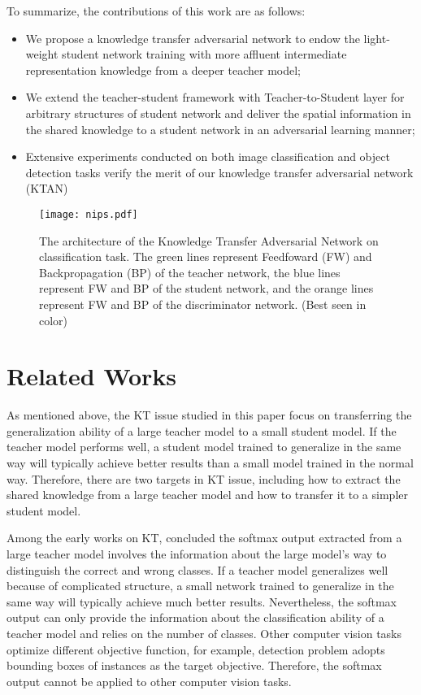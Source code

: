 \documentclass[letterpaper]{article} %
\begin{document}
To summarize, the contributions of this work are as follows:

\begin{itemize}
\item{We propose a knowledge transfer adversarial network to endow the light-weight student network training with more affluent intermediate representation knowledge from a deeper teacher model;} 
\item{We extend the teacher-student framework with Teacher-to-Student layer for arbitrary structures of student network and deliver the spatial information in the shared knowledge to a student network in an adversarial learning manner;} 
\item{Extensive experiments conducted on both image classification and object detection tasks verify the merit of our knowledge transfer adversarial network (KTAN)} 
\end{itemize}

\begin{figure*}[t]
    \begin{center}
        \texttt{[image: nips.pdf]}
        \caption{The architecture of the Knowledge Transfer Adversarial Network on classification task. The green lines represent Feedfoward (FW) and Backpropagation (BP) of the teacher network, the blue lines represent FW and BP of the student network, and the orange lines represent FW and BP of the discriminator network. (Best seen in color)}
        \label{fig:fig1}
    \end{center}
\end{figure*}

\section{Related Works}

As mentioned above, the KT issue studied in this paper focus on transferring the generalization ability of a large teacher model to a small student model. If the teacher model performs well, a student model trained to generalize in the same way will typically achieve better results than a small model trained in the normal way. Therefore, there are two targets in KT issue, including how to extract the shared knowledge from a large teacher model and how to transfer it to a simpler student model.

Among the early works on KT, \cite{hinton2015distilling} concluded the softmax output extracted from a large teacher model involves the information about the large model's way to distinguish the correct and wrong classes. If a teacher model generalizes well because of complicated structure, a small network trained to generalize in the same way will typically achieve much better results. Nevertheless, the softmax output can only provide the information about the classification ability of a teacher model and relies on the number of classes. Other computer vision tasks optimize different objective function, for example, detection problem adopts bounding boxes of instances as the target objective. Therefore, the softmax output cannot be applied to other computer vision tasks.
\end{document}
